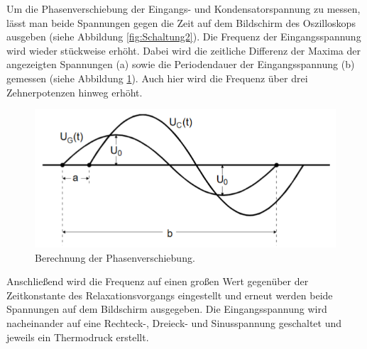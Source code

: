 Um die Phasenverschiebung der Eingangs- und Kondensatorspannung zu messen,
lässt man beide Spannungen gegen die Zeit auf dem Bildschirm des Oszilloskops ausgeben (siehe Abbildung \ref{fig:Schaltung2}).
Die Frequenz der Eingangsspannung wird wieder stückweise erhöht. Dabei wird
die zeitliche Differenz der Maxima der angezeigten Spannungen (a) sowie die Periodendauer der Eingangsspannung (b)
gemessen (siehe Abbildung \ref{fig:Rechnung}).
Auch hier wird die Frequenz über drei Zehnerpotenzen hinweg erhöht.

\begin{figure}[H]
  \centering
  \includegraphics[width=14cm]{Rechnung.PNG}
  \caption{Berechnung der Phasenverschiebung. \cite{sample}}
  \label{fig:Rechnung}
\end{figure}

Anschließend wird die Frequenz auf einen großen Wert gegenüber der Zeitkonstante
des Relaxationsvorgangs eingestellt und erneut werden beide Spannungen auf dem
Bildschirm ausgegeben. Die Eingangsspannung wird nacheinander auf eine Rechteck-, Dreieck-
und Sinusspannung geschaltet und jeweils ein Thermodruck erstellt.

